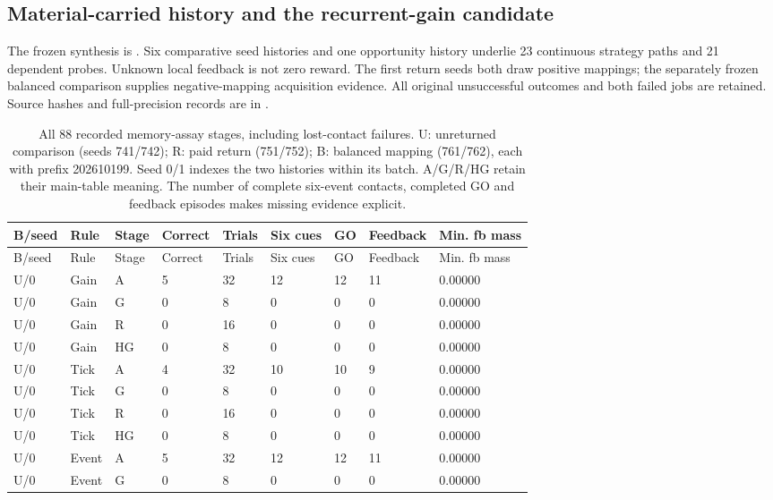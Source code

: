 \subsection*{Material-carried history and the recurrent-gain candidate}
The frozen synthesis is . Six comparative seed histories and one opportunity history underlie 23 continuous strategy paths and 21 dependent probes. Unknown local feedback is not zero reward. The first return seeds both draw positive mappings; the separately frozen balanced comparison supplies negative-mapping acquisition evidence. All original unsuccessful outcomes and both failed jobs are retained. Source hashes and full-precision records are in .
\begingroup\scriptsize\setlength{\tabcolsep}{3pt}
\begin{longtable}{lllllllll}
\caption{All 88 recorded memory-assay stages, including lost-contact failures. U: unreturned comparison (seeds 741/742); R: paid return (751/752); B: balanced mapping (761/762), each with prefix 202610199. Seed 0/1 indexes the two histories within its batch. A/G/R/HG retain their main-table meaning. The number of complete six-event contacts, completed GO and feedback episodes makes missing evidence explicit.}\label{tab:local-history-stages}\\
\toprule
B/seed & Rule & Stage & Correct & Trials & Six cues & GO & Feedback & Min. fb mass \\
\midrule
\endfirsthead
\toprule
B/seed & Rule & Stage & Correct & Trials & Six cues & GO & Feedback & Min. fb mass \\
\midrule
\endhead
U/0 & Gain & A & 5 & 32 & 12 & 12 & 11 & 0.00000 \\
U/0 & Gain & G & 0 & 8 & 0 & 0 & 0 & 0.00000 \\
U/0 & Gain & R & 0 & 16 & 0 & 0 & 0 & 0.00000 \\
U/0 & Gain & HG & 0 & 8 & 0 & 0 & 0 & 0.00000 \\
U/0 & Tick & A & 4 & 32 & 10 & 10 & 9 & 0.00000 \\
U/0 & Tick & G & 0 & 8 & 0 & 0 & 0 & 0.00000 \\
U/0 & Tick & R & 0 & 16 & 0 & 0 & 0 & 0.00000 \\
U/0 & Tick & HG & 0 & 8 & 0 & 0 & 0 & 0.00000 \\
U/0 & Event & A & 5 & 32 & 12 & 12 & 11 & 0.00000 \\
U/0 & Event & G & 0 & 8 & 0 & 0 & 0 & 0.00000 \\

\end{longtable}
